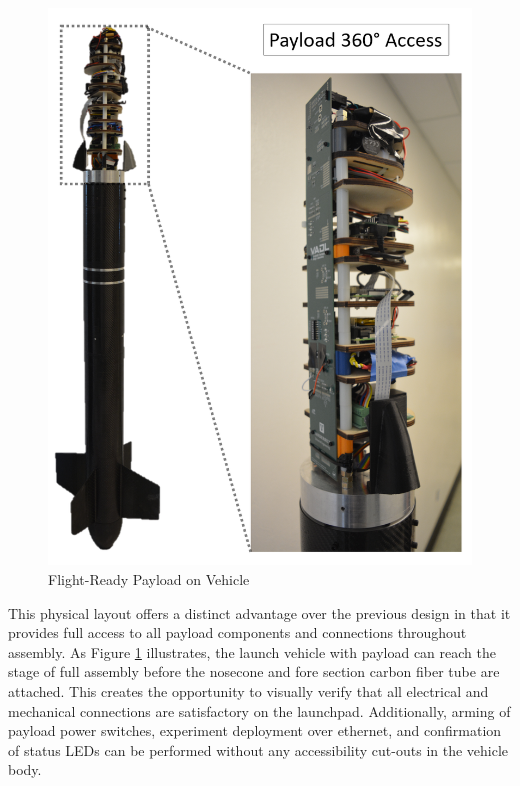 \documentclass[class=article, crop=false]{standalone}
\begin{document}
	\FloatBarrier{}
	\begin{figure}[!h]
		\centering
		\includegraphics[width=0.7\linewidth]{09_Figures/Payload/360access.png}
		\caption{Flight-Ready Payload on Vehicle}
		\label{fig:360access}
	\end{figure}
	\FloatBarrier{}
	
	This physical layout offers a distinct advantage over the previous design in that it provides full access to all payload components and connections throughout assembly. As Figure \ref{fig:360access} illustrates, the launch vehicle with payload can reach the stage of full assembly before the nosecone and fore section carbon fiber tube are attached. This creates the opportunity to visually verify that all electrical and mechanical connections are satisfactory on the launchpad. Additionally, arming of payload power switches, experiment deployment over ethernet, and confirmation of status LEDs can be performed without any accessibility cut-outs in the vehicle body.
	
	
\end{document}
